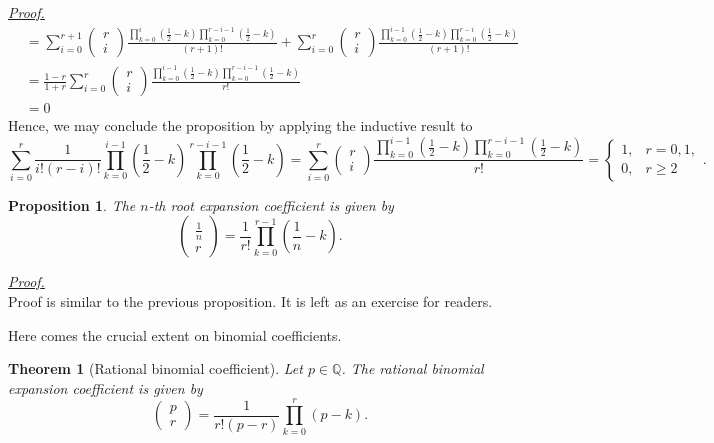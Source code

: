 \documentclass[12pt]{article}
\newtheorem*{theorem}{Theorem}
\newtheorem*{proposition}{Proposition}
\renewenvironment{proof}[1][Proof]{\begin{snugshade*} \underline{\textit{{#1}.}}\\}{\hfill \qedsymbol \end{snugshade*}}
\begin{document}
\begin{proof}
\begin{align*}
            &=\sum_{i=0}^{r+1}\begin{pmatrix}
                r\\i
            \end{pmatrix}\frac{\prod_{k=0}^{i}(\frac{1}{2}-k)\prod_{k=0}^{r-i-1}(\frac{1}{2}-k)}{(r+1)!}+\sum_{i=0}^{r}\begin{pmatrix}
                r\\i
            \end{pmatrix}\frac{\prod_{k=0}^{i-1}(\frac{1}{2}-k)\prod_{k=0}^{r-i}(\frac{1}{2}-k)}{(r+1)!}\\
            &=\frac{1-r}{1+r}\sum_{i=0}^{r}\begin{pmatrix}
                r\\i
            \end{pmatrix}\frac{\prod_{k=0}^{i-1}(\frac{1}{2}-k)\prod_{k=0}^{r-i-1}(\frac{1}{2}-k)}{r!}\\
            &=0
        \end{align*}
        Hence, we may conclude the proposition by applying the inductive result to \[\sum_{i=0}^{r}\frac{1}{i!(r-i)!}\prod_{k=0}^{i-1}(\frac{1}{2}-k)\prod_{k=0}^{r-i-1}(\frac{1}{2}-k)=\sum_{i=0}^{r}\begin{pmatrix}
            r\\i
        \end{pmatrix}\frac{\prod_{k=0}^{i-1}(\frac{1}{2}-k)\prod_{k=0}^{r-i-1}(\frac{1}{2}-k)}{r!}=\begin{cases}
            1,&r=0,1,\\
            0,&r\geq 2
        \end{cases}.\]
    \end{proof}

    \begin{proposition}
        The $n$-th root expansion coefficient is given by \[\begin{pmatrix}
            \frac{1}{n}\\r
        \end{pmatrix}=\frac{1}{r!}\prod_{k=0}^{r-1}(\frac{1}{n}-k).\] 
    \end{proposition}

    \begin{proof}
        Proof is similar to the previous proposition. It is left as an exercise for readers.
    \end{proof}

    Here comes the crucial extent on binomial coefficients.

    \begin{theorem}[Rational binomial coefficient]
        Let $p\in\mathbb{Q}$. The rational binomial expansion coefficient is given by \[\begin{pmatrix}
            p\\r
        \end{pmatrix}=\frac{1}{r!(p-r)}\prod_{k=0}^{r}(p-k).\]
    \end{theorem}
\end{document}
